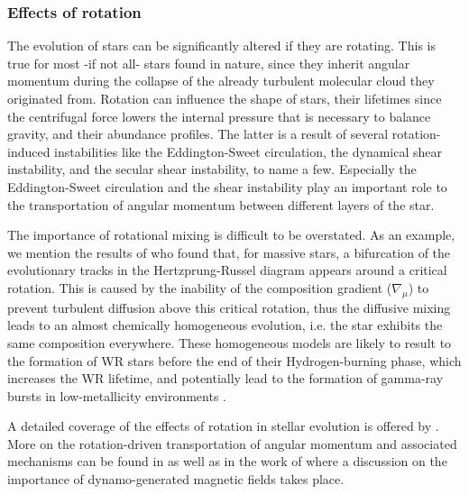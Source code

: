 \documentclass[../../main/thesis_msc.tex]{subfiles}
\begin{document}
						
						
						
						
					\subsubsection{Effects of rotation}
					
						The evolution of stars can be significantly altered if they are rotating. This is true for most -if not all- stars found in nature, since they inherit angular momentum during the collapse of the already turbulent molecular cloud they originated from. Rotation can influence the shape of stars, their lifetimes since the centrifugal force lowers the internal pressure that is necessary to balance gravity, and their abundance profiles. The latter is a result of several rotation-induced instabilities like the Eddington-Sweet circulation, the dynamical shear instability, and the secular shear instability, to name a few. Especially the Eddington-Sweet circulation and the shear instability play an important role to the transportation of angular momentum between different layers of the star. 
						
						The importance of rotational mixing is difficult to be overstated. As an example, we mention the results of \cite{Maeder1987} who found that, for massive stars, a bifurcation of the evolutionary tracks in the Hertzprung-Russel diagram appears around a critical rotation. This is caused by the inability of the composition gradient ($\nabla_{\mu}$) to prevent turbulent diffusion above this critical rotation, thus the diffusive mixing leads to an almost chemically homogeneous evolution, i.e. the star exhibits the same composition everywhere. These homogeneous models are likely to result to the formation of WR stars before the end of their Hydrogen-burning phase, which increases the WR lifetime, and potentially lead to the formation of gamma-ray bursts in low-metallicity environments \citep{Yoon2005}.
						
						A detailed coverage of the effects of rotation in stellar evolution is offered by \cite{Langer1997, Heger2000, Hirschi, Maeder2006, langer12, Palacios}. More on the rotation-driven transportation of angular momentum and associated mechanisms can be found in \cite{Heger2005, langer12} as well as in the work of \cite{Spruit2002} where a discussion on the importance of dynamo-generated magnetic fields takes place.
						
						
						
\end{document}
